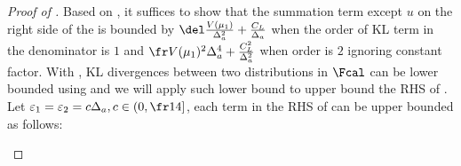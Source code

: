 \begin{proof}[Proof of ]
    Based on , it suffices to show that the summation term except $u$ on the right side of the  is bounded by $\CommonFactorInRegretBound$ when the order of KL term in the denominator is $1$ and $\CommonFactorInRegretBoundSquared$ when order is $2$ ignoring constant factor.
    With , KL divergences between two distributions in $\Fcal$ can be lower bounded using  and we will apply such lower bound to upper bound the RHS of .
    Let $\varepsilon_1 = \varepsilon_2 = c\Delta_a, c\in(0, \fr14]$, each term in the RHS of  can be upper bounded as follows:
    
    \begin{itemize}
    

\end{itemize}
\end{proof}

